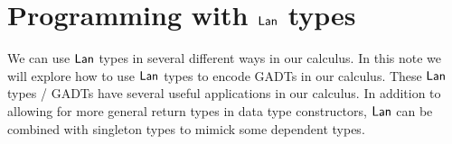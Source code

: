 \documentclass[acmsmall,review,anonymous]{acmart}
\theoremstyle{definition}
\begin{document}
\begin{comment}
    \[\begin{array}{l}
    \nat = (\mu \beta. \onet + \beta) \\
    Z = \onet \\
    S \, \beta = (\mu \phi. \lambda \alpha. \alpha) \beta \\
    \mathit{GNat} \, \beta = 
    (\mu \phi. \lambda \alpha. 
      (\Lan^\emptyset_Z \, 1)\alpha 
      + (\Lan^\gamma_{S\,\gamma} \, \phi \gamma)\alpha)\beta \\
    \mathit{GVec} \, \beta_1 \, \beta_2 = 
      (\mu \phi. \lambda \alpha_1, \alpha_2. 
        (\Lan^\gamma_{\gamma, \mathit{GNat}\,Z} \, 1)(\alpha_1, \alpha_2)
      + (\Lan^{\gamma_1,\gamma_2}_{\gamma_1, \mathit{GNat} \, (S\,\gamma_2)}
            \,\gamma_1 \times \phi (\gamma_1, \mathit{GNat} \, \gamma_2))(\alpha_1, \alpha_2)
            )(\beta_1, \beta_2) \\
      \color{red} \mbox{Note: GVec uses GNat as a subscript}\\
      \mathit{GTree} \, \beta_1 \, \beta_2 =
        (\mu \phi. \lambda \alpha_1, \alpha_2.
          (\Lan^\gamma_{\gamma, Z} \, \gamma)(\alpha_1, \alpha_2)
        + (\Lan^{\gamma_1, \gamma_2}_{\gamma, S\,\gamma_2} \, \phi\,(\gamma_1,\gamma_2) \times \phi\,(\gamma_1,\gamma_2))(\alpha_1, \alpha_2)
        )(\beta_1, \beta_2) \\
      \mathit{PTree} \, \beta = 
        (\mu \phi. \lambda \alpha. \alpha + \phi\,(\alpha \times \alpha))\beta \\

    \mathit{Term} \, \beta = (\mu \phi. \lambda \alpha. 
      (\Lan^\emptyset_\nat \, \nat)\alpha
    + (\Lan^\emptyset_\nat \, \phi \nat)\alpha
    + (\Lan^\emptyset_{\mathit{Bool}} \, \phi \nat)\alpha
    + (\Lan^{\gamma_1, \gamma_2}_{\gamma_1 \times \gamma_2} \, \phi \gamma_1 \times \phi \gamma_2)\alpha)\beta\\
      \mathit{Eql} \, \beta_1 \, \beta_2 = (\Lan^\gamma_{\gamma, \gamma} 1)(\beta_1, \beta_2)
    \end{array}\]
  \end{comment}


\section{Programming with $\mathsf{Lan}$ types}
We can use $\mathsf{Lan}$ types in several different ways in our calculus. In this note
we will explore how to use $\mathsf{Lan}$ types to encode GADTs in our calculus. 
These $\mathsf{Lan}$ types / GADTs have several useful applications in our calculus.
In addition to allowing for more general return types in data type constructors,
$\mathsf{Lan}$ can be combined with singleton types to mimick some dependent types.
\end{document}
